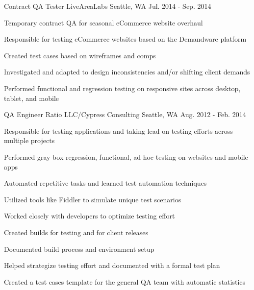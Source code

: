 \begin{cventries}
\cventry
{Contract QA Tester} %
{LiveAreaLabs} %
{Seattle, WA} %
{Jul. 2014 - Sep. 2014} %
{
\begin{cvitems}
\item[] {Temporary contract QA for seasonal eCommerce website overhaul}
\item[]
\item {Responsible for testing eCommerce websites based on the Demandware platform}
\item {Created test cases based on wireframes and comps}
\item {Investigated and adapted to design inconsistencies and/or shifting client demands}
\item {Performed functional and regression testing on responsive sites across desktop, tablet, and mobile}
\end{cvitems}
}

\cventry
{QA Engineer} %
{Ratio LLC/Cypress Consulting} %
{Seattle, WA} %
{Aug. 2012 - Feb. 2014} %
{
\begin{cvitems}
\item[] {Responsible for testing applications and taking lead on testing efforts across multiple projects}
\item[]
\item {Performed gray box regression, functional, ad hoc testing on websites and mobile apps}
\item {Automated repetitive tasks and learned test automation techniques}
\item {Utilized tools like Fiddler to simulate unique test scenarios}
\item {Worked closely with developers to optimize testing effort}
\item {Created builds for testing and for client releases}
\item {Documented build process and environment setup}
\item {Helped strategize testing effort and documented with a formal test plan}
\item {Created a test cases template for the general QA team with automatic statistics}
\end{cvitems}
}


\end{cventries}
